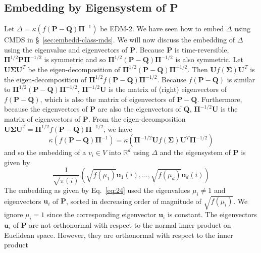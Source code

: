 \documentclass[10pt,twocolumn]{article}
\numberwithin{equation}{section}
\begin{document}
\subsection{Embedding by Eigensystem of P}
\label{sec:embedd-eigensyst-p}
Let $\Delta = \kappa(f(\mathbf{P} - \mathbf{Q})\bm{\Pi}^{-1})$ be
EDM-2. We have seen how to embed $\Delta$ using CMDS in
\S~\ref{sec:embedd-class-mds}. We will now discuss the embedding of
$\Delta$ using the eigenvalue and eigenvectors of
$\mathbf{P}$. Because $\mathbf{P}$ is time-reversible, $\bm{\Pi}^{1/2}
\mathbf{P} \bm{\Pi}^{-1/2}$ is symmetric and so
$\bm{\Pi}^{1/2}(\mathbf{P} - \mathbf{Q})\bm{\Pi}^{-1/2}$ is also
symmetric. Let $\mathbf{U} \bm{\Sigma} \mathbf{U}^{T}$ be the
eigen-decomposition of $\bm{\Pi}^{1/2}(\mathbf{P} -
\mathbf{Q})\bm{\Pi}^{-1/2}$. Then $\mathbf{U} f(\bm{\Sigma})
\mathbf{U}^{T}$ is the eigen-decomposition
of $\bm{\Pi}^{1/2} 
f(\mathbf{P} - \mathbf{Q}) \bm{\Pi}^{-1/2}$. Because $f(\mathbf{P} -
\mathbf{Q})$ is similar to $\bm{\Pi}^{1/2}(\mathbf{P} -
\mathbf{Q})\bm{\Pi}^{-1/2}$, $\bm{\Pi}^{-1/2}\mathbf{U}$ is the matrix
of (right) eigenvectors of $f(\mathbf{P} - \mathbf{Q})$, which is also
the matrix of eigenvectors of $\mathbf{P} - \mathbf{Q}$. Furthermore,
because the eigenvectors of $\mathbf{P}$ are also the eigenvectors of
$\mathbf{Q}$, $\bm{\Pi}^{-1/2}\mathbf{U}$ is the matrix of
eigenvectors of $\mathbf{P}$. From the eigen-decomposition
$\mathbf{U}\bm{\Sigma}\mathbf{U}^{T} =
\bm{\Pi}^{1/2}f(\mathbf{P}-\mathbf{Q})\bm{\Pi}^{-1/2}$, we have
\begin{equation*}
    \kappa(f(\mathbf{P} - \mathbf{Q})\bm{\Pi}^{-1})=
    \kappa(\bm{\Pi}^{-1/2}\mathbf{U}f(\bm{\Sigma})\mathbf{U}^{T}\bm{\Pi}^{-1/2})
\end{equation*}
and so the embedding of a $v_i \in V$ into $\mathbb{R}^{d}$ using
$\Delta$ and the eigensystem of $\mathbf{P}$ is given by
\begin{equation}
  \label{eq:24}
   \frac{1}{\sqrt{\pi(i)}} (\sqrt{f(\mu_1)} \mathbf{u}_1(i),
    \dots, \sqrt{f(\mu_d)} \mathbf{u}_{d}(i))
\end{equation}
The embedding as given by Eq.~\eqref{eq:24} used the eigenvalues
$\mu_i \not= 1$ and eigenvectors $\mathbf{u}_i$ of $\mathbf{P}$,
sorted in decreasing order of magnitude of $\sqrt{f(\mu_i)}$. We
ignore $\mu_i = 1$ since the corresponding eigenvector $\mathbf{u}_i$
is constant. The eigenvectors $\mathbf{u}_i$ of $\mathbf{P}$ are not
orthonormal with respect to the normal inner product on Euclidean
space. However, they are orthonormal with respect to the inner product
\end{document}
